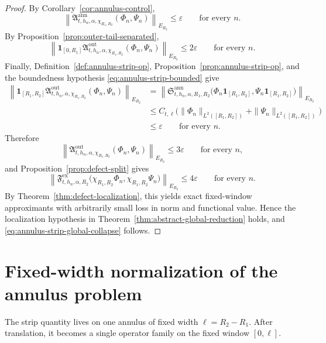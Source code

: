 \documentclass[11pt,a4paper]{amsart}
\theoremstyle{plain}
\theoremstyle{definition}
\theoremstyle{remark}
\newcommand{\one}{\mathbf 1}
\begin{document}
\begin{proof}
By Corollary~\ref{cor:annulus-control},
\[
\left\|
\mathfrak A_{t,h_n,\alpha,\chi_{R_1,R_2}}^{\mathrm{ann}}(\Phi_n,\Psi_n)
\right\|_{E_{R_2}}
\le
\varepsilon
\qquad\text{for every }n.
\]
By Proposition~\ref{prop:outer-tail-separated},
\[
\left\|
\one_{[0,R_1]}
\mathfrak A_{t,h_n,\alpha,\chi_{R_1,R_2}}^{\mathrm{out}}(\Phi_n,\Psi_n)
\right\|_{E_{R_2}}
\le
2\varepsilon
\qquad\text{for every }n.
\]
Finally, Definition~\ref{def:annulus-strip-op}, Proposition~\ref{prop:annulus-strip-op}, and the
boundedness hypothesis \eqref{eq:annulus-strip-bounded} give
\begin{align*}
\left\|
\one_{[R_1,R_2]}
\mathfrak A_{t,h_n,\alpha,\chi_{R_1,R_2}}^{\mathrm{out}}(\Phi_n,\Psi_n)
\right\|_{E_{R_2}}
&=
\left\|
\mathfrak S_{t,h_n,\alpha,R_1,R_2}^{\mathrm{ann}}
\bigl(
\Phi_n\one_{[R_1,R_2]},
\Psi_n\one_{[R_1,R_2]}
\bigr)
\right\|_{E_{R_2}}\\
&\le
C_{t,\ell}
\bigl(
\|\Phi_n\|_{L^2([R_1,R_2])}
+
\|\Psi_n\|_{L^2([R_1,R_2])}
\bigr)\\
&\le
\varepsilon
\qquad\text{for every }n.
\end{align*}
Therefore
\[
\left\|
\mathfrak A_{t,h_n,\alpha,\chi_{R_1,R_2}}^{\mathrm{out}}(\Phi_n,\Psi_n)
\right\|_{E_{R_2}}
\le
3\varepsilon
\qquad\text{for every }n,
\]
and Proposition~\ref{prop:defect-split} gives
\[
\left\|
\mathfrak F_{t,h_n,\alpha,R_2}^{\mathrm{ex}}
\bigl(
\chi_{R_1,R_2}\Phi_n,\chi_{R_1,R_2}\Psi_n
\bigr)
\right\|_{E_{R_2}}
\le
4\varepsilon
\qquad\text{for every }n.
\]
By Theorem~\ref{thm:defect-localization}, this yields exact fixed-window approximants with
arbitrarily small loss in norm and functional value. Hence the localization hypothesis in
Theorem~\ref{thm:abstract-global-reduction} holds, and \eqref{eq:annulus-strip-global-collapse}
follows.
\end{proof}

\section{Fixed-width normalization of the annulus problem}
\label{sec:annulus-normalization}

The strip quantity lives on one annulus of fixed width \(\ell=R_2-R_1\).  After translation, it
becomes a single operator family on the fixed window \([0,\ell]\).
\end{document}
